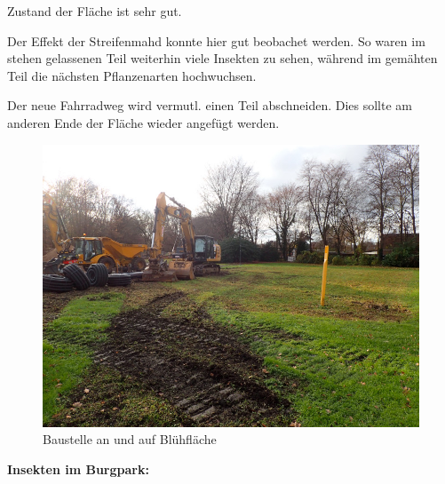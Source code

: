 \documentclass[10pt]{article}
\begin{document}
\begin{flushleft}
Zustand der Fläche ist sehr gut.

Der Effekt der Streifenmahd konnte hier gut beobachet werden.
So waren im stehen gelassenen Teil weiterhin viele Insekten zu sehen, während im gemähten Teil die nächsten Pflanzenarten hochwuchsen.

Der neue Fahrradweg wird vermutl. einen Teil abschneiden. 
Dies sollte am anderen Ende der Fläche wieder angefügt werden.


\begin{figure}[h!]
  \centering
  \includegraphics[width=0.45\linewidth]{img/burgpark/baustelle.jpg}
  \caption{Baustelle an und auf Blühfläche}
  \label{fig:boat1}
\end{figure}

\end{flushleft}

\newpage

\textbf{Insekten im Burgpark:}
\end{document}
